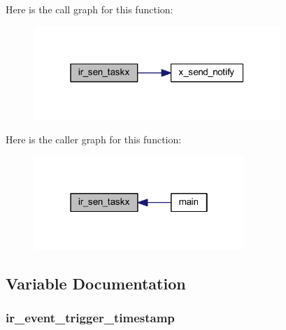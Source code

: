 Here is the call graph for this function\+:\nopagebreak
\begin{figure}[H]
\begin{center}
\leavevmode
\includegraphics[width=265pt]{d6/d97/a00045_a24529100c87dfc257e9b56f7f0bcfa78_cgraph}
\end{center}
\end{figure}




Here is the caller graph for this function\+:\nopagebreak
\begin{figure}[H]
\begin{center}
\leavevmode
\includegraphics[width=226pt]{d6/d97/a00045_a24529100c87dfc257e9b56f7f0bcfa78_icgraph}
\end{center}
\end{figure}




\subsection{Variable Documentation}
\hypertarget{a00045_a6951f534a479b17c02d7da3ad6489634}{
\subsubsection[{ir\+\_\+event\+\_\+trigger\+\_\+timestamp}]{ ir\+\_\+event\+\_\+trigger\+\_\+timestamp}}\label{a00045_a6951f534a479b17c02d7da3ad6489634}


